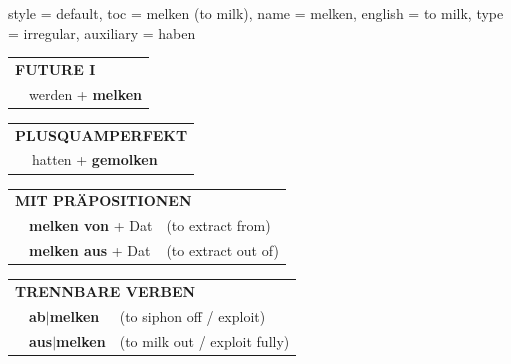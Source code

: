 \begin{verbentry}{
  style = {default},
  toc = {melken (to milk)},
  name = {melken},
  english = {to milk},
  type = {irregular},
  auxiliary = {haben}
}
\begin{tabular}{rl}
    \multicolumn{2}{l}{\textbf{FUTURE I} }\\
   & werden + \textbf{melken}\\
 
  \end{tabular}
\hfill
   \begin{tabular}{rl}
      \multicolumn{2}{l}{\textbf{PLUSQUAMPERFEKT}}\\
   & hatten + \textbf{gemolken}\\
  \end{tabular}

   \vspace{10pt}

   \begin{tabular}{lll}
      \multicolumn{3}{l}{\textbf{MIT PRÄPOSITIONEN}}\\
& \textbf{melken von} + Dat & (to extract from)\\
& \textbf{melken aus} + Dat & (to extract out of)\\
   \end{tabular}
  \hfill
   \begin{tabular}{lll}
      \multicolumn{3}{l}{\textbf{TRENNBARE VERBEN}}\\
 & \textbf{ab$|$melken} & (to siphon off / exploit)\\
 & \textbf{aus$|$melken} & (to milk out / exploit fully)\\
  \end{tabular}

\vspace{-5pt}
\end{verbentry}

